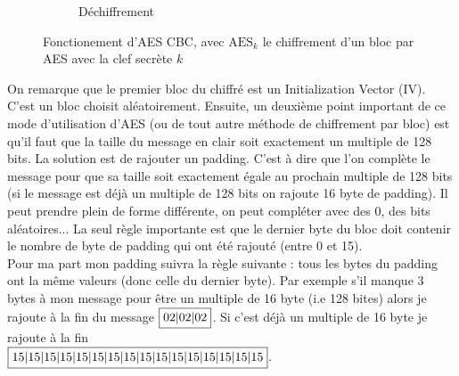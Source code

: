 \documentclass[a4paper, 12pt]{article}
\begin{document}
\begin{figure}[h]
\begin{subfigure}{\textwidth}
\caption{Déchiffrement}
\end{subfigure}
\caption{Fonctionement d'AES CBC, avec $\text{AES}_k$ le chiffrement d'un bloc par AES avec la clef secrète $k$}
\label{ilu_cbc}
\end{figure}

On remarque que le premier bloc du chiffré est un Initialization Vector (IV). C'est un bloc choisit aléatoirement. Ensuite, un deuxième point important de ce mode d'utilisation d'AES (ou de tout autre méthode de chiffrement par bloc) est qu'il faut que la taille du message en clair soit exactement un multiple de 128 bits. La solution est de rajouter un padding. C'est à dire que l'on complète le message pour que sa taille soit exactement égale au prochain multiple de 128 bits (si le message est déjà un multiple de 128 bits on rajoute 16 byte de padding). Il peut prendre plein de forme différente, on peut compléter avec des $0$, des bits aléatoires... La seul règle importante est que le dernier byte du bloc doit contenir le nombre de byte de padding qui ont été rajouté (entre 0 et 15). \\

Pour ma part mon padding suivra la règle suivante : tous les bytes du padding ont la même valeurs (donc celle du dernier byte).
Par exemple s'il manque 3 bytes à mon message pour être un multiple de 16 byte (i.e 128 bites) alors je rajoute à la fin du message $\fbox{02|02|02}$. Si c'est déjà un multiple de 16 byte je rajoute à la fin\\ $\fbox{15|15|15|15|15|15|15|15|15|15|15|15|15|15|15|15}$.\\
\end{document}
